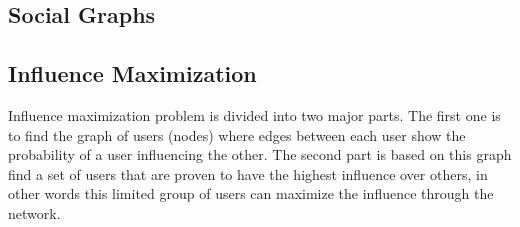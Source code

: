 \documentclass[english]{tktltiki}
\begin{document}
\subsection{Social Graphs}

\subsection{Influence Maximization}
Influence maximization problem is divided into two major parts. The first one is to find the graph of users (nodes) where edges between each user show the probability of  a user influencing the other. The second part is
based on this graph find a set of users that are proven to have the highest influence over others, in other words 
this limited group of users can maximize the influence through the network.
\end{document}
